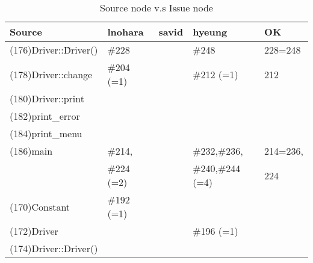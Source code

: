 \begin{table}[hb]
\begin{center}
\begin{tabular}{|l|l|l|l|l|}
\hline
Source & lnohara & savid & hyeung & OK\\
\hline
(176)Driver::\~Driver() & \#228 &  & \#248 & 228=248\\
(178)Driver::change & \#204 (=1) &  & \#212 (=1)& 212\\
(180)Driver::print &  &  & & \\
(182)print\_error &  &  & & \\
(184)print\_menu &  &  & & \\
(186)main & \#214, &  & \#232,\#236,      & 214=236, \\
          & \#224 (=2) & & \#240,\#244 (=4) & 224 \\
(170)Constant & \#192 (=1) &  & & \\
(172)Driver &  &  & \#196 (=1)& \\
(174)Driver::Driver() &  &  & & \\
\hline
\end{tabular}
\caption{Source node v.s Issue node}
\end{center}
\end{table}

